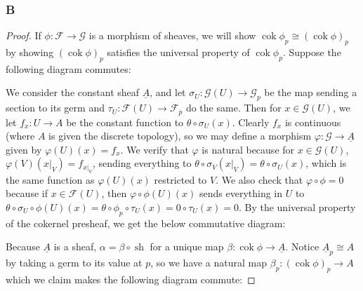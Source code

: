 \documentclass{article}
\newcommand{\fF}{\mathscr{F}}
\newcommand{\fG}{\mathscr{G}}
\DeclareMathOperator{\cok}{\mathrm{cok}}
\DeclareMathOperator{\cokpre}{\cok_{\text{pre}}}
\DeclareMathOperator{\sh}{sh}
\begin{document}
\subsubsection{B}\label{2.6.B}
\begin{proof}
    If $\phi:\fF\to \fG$ is a morphism of sheaves, we will show $\cok \phi_p\cong (\cok \phi)_p$ by showing $(\cok \phi)_p$ satisfies the universal property of $\cok \phi_p$. Suppose the following diagram commutes:
    \begin{center}
    \end{center}
    We consider the constant sheaf $\underline{A}$, and let $\sigma_U:\fG(U)\to \fG_p$ be the map sending a section to its germ and $\tau_U:\fF(U)\to \fF_p$ do the same. Then for $x\in \fG(U)$, we let $f_x:U\to A$ be the constant function to $\theta \circ \sigma_U(x)$. Clearly $f_x$ is continuous (where $A$ is given the discrete topology), so we may define a morphism $\varphi:\fG \to \underline{A}$ given by $\varphi(U)(x)=f_x$. We verify that $\varphi$ is natural because for $x\in \fG(U)$, $\varphi(V)(x\vert_V)=f_{x\vert_V}$, sending everything to $\theta \circ \sigma _V(x\vert_V)=\theta \circ \sigma_U(x)$, which is the same function as $\varphi(U)(x)$ restricted to $V$. We also check that $\varphi \circ \phi = 0$ because if $x\in \fF(U)$, then $\varphi \circ \phi(U)(x)$ sends everything in $U$ to $\theta \circ \sigma_U \circ \phi(U)(x) = \theta \circ \phi_p \circ \tau_U(x)=0\circ \tau_U(x)=0$. By the universal property of the cokernel presheaf, we get the below commutative diagram:
    \begin{center}
    \end{center}
    Because $\underline{A}$ is a sheaf, $\alpha=\beta \circ \sh$ for a unique map $\beta:\cok \phi \to \underline{A}$. Notice $\underline{A}_p \cong A$ by taking a germ to its value at $p$, so we have a natural map $\beta_p:(\cok \phi)_p\to A$ which we claim makes the following diagram commute:

\end{proof}
\end{document}
